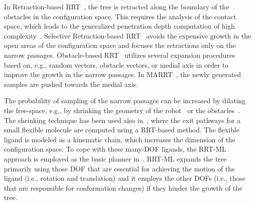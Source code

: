 \documentclass[usletter, 10pt, conference]{ieeeconf} %
\def\qrand{q_{rand}}
\def\qnear{q_{near}}
\begin{document}

In Retraction-based RRT~\cite{zhangRetraction}, the tree is retracted along the boundary of the obstacles in the configuration space.
This requires the analysis of the contact space, which leads to the generalized penetration depth computation of high complexity~\cite{he2016efficient}. %
Selective Retraction-based RRT~\cite{lee2012srrrt} avoids the expensive growth in the open areas of the configuration space and focuses 
the retractions only on the narrow passages.
Obstacle-based RRT~\cite{amatoOBRRT} utilizes several expansion procedures based on, e.g., random vectors, obstacle vectors, or medial axis in order to improve the growth in the narrow passages.
In MARRT~\cite{denny2014marrt}, the newly generated samples are pushed towards the medial axis.

The probability of sampling of the narrow passages can be increased by dilating the free-space, e.g., by shrinking the geometry of 
the robot~\cite{hsuOnProb} or the obstacles~\cite{bayazitIRC}.
The shrinking technique has been used also in~\cite{cortes2010simulating}, where the exit pathways for a small flexible molecule are
computed using a RRT-based method.
The flexible ligand is modeled as a kinematic chain, which increases the dimension of the configuration space.
To cope with these many-DOF ligands, the RRT-ML~\cite{cortes2007mlrrt} approach is employed as the basic planner in~\cite{cortes2010simulating}.
RRT-ML expands the tree primarily using those DOF that are essential for achieving the motion of the ligand (i.e., rotation
and translation) and it employs the other DOFs (i.e., those that are responsible for conformation changes) if they hinder the growth of the tree.
\end{document}

